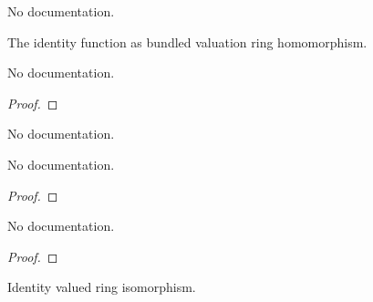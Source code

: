 \begin{definition}\label{ValRingEquiv.mk'}
                No documentation.
    \end{definition}

\begin{definition}\label{ValRingHom.id}
        \leanok
                The identity function as bundled valuation ring homomorphism.
    \end{definition}

\begin{theorem}\label{ValAlgHom.id_apply}
        \leanok
                No documentation.
    \end{theorem}

\begin{proof}
    \leanok
\end{proof}

\begin{definition}\label{ValRingHom.comp}
        \leanok
                No documentation.
    \end{definition}

\begin{theorem}\label{ValAlgHom.id_comp}
        \leanok
                No documentation.
    \end{theorem}

\begin{proof}
    \leanok
\end{proof}

\begin{theorem}\label{ValAlgHom.comp_id}
        \leanok
                No documentation.
    \end{theorem}

\begin{proof}
    \leanok
\end{proof}

\begin{definition}\label{ValAlgEquiv.refl}
        \leanok
                Identity valued ring isomorphism.
    \end{definition}

